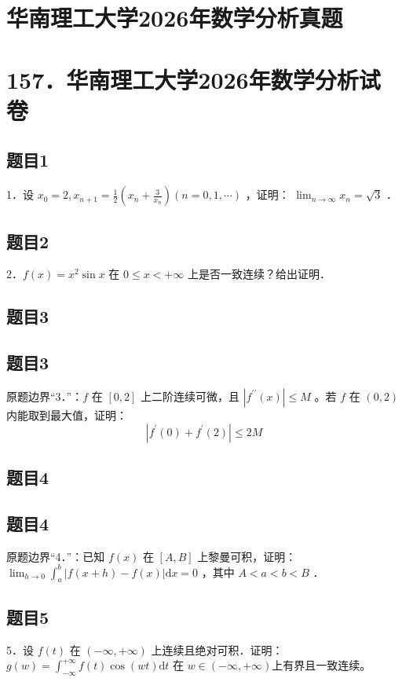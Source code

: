 \documentclass{article}
\begin{document}
\section*{华南理工大学2026年数学分析真题}
\section*{157．华南理工大学2026年数学分析试卷}

\subsection{题目1}
1．设 \(x_{0}=2, x_{n+1}=\frac{1}{2}\left(x_{n}+\frac{3}{x_{n}}\right)(n=0,1, \cdots)\) ，证明： \(\lim _{n \rightarrow \infty} x_{n}=\sqrt{3}\) ．

\subsection{题目2}
2．\(f(x)=x^{2} \sin x\) 在 \(0 \leq x<+\infty\) 上是否一致连续？给出证明．

\begin{itemize}

\subsection{题目3}
\end{itemize}

\subsection{题目3}
原题边界“3．”：\(f\) 在 \([0,2]\) 上二阶连续可微，且 \(\left|f^{\prime \prime}(x)\right| \leq M\) 。若 \(f\) 在 \((0,2)\) 内能取到最大值，证明：
\[
\left|f^{\prime}(0)+f^{\prime}(2)\right| \leq 2 M
\]

\subsection{题目4}

\subsection{题目4}
原题边界“4．”：已知 \(f(x)\) 在 \([A, B]\) 上黎曼可积，证明： \(\lim _{h \rightarrow 0} \int_{a}^{b}|f(x+h)-f(x)| \mathrm{d} x=0\) ，其中 \(A<a<b<B\) ．

\subsection{题目5}
5．设 \(f(t)\) 在 \((-\infty,+\infty)\) 上连续且绝对可积．证明：\(g(w)=\int_{-\infty}^{+\infty} f(t) \cos (w t) \mathrm{d} t\) 在 \(w \in(-\infty,+\infty)\)上有界且一致连续。
\end{document}
